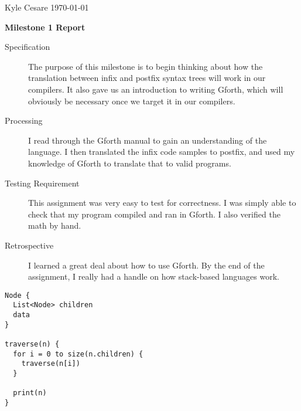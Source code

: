\documentclass[12pt,letterpaper]{article}
\begin{document}
Kyle Cesare \hfill
\today \hfill

{\center\textbf{Milestone 1 Report} \\}

\begin{description}

\item[Specification] The purpose of this milestone is to begin thinking about
how the translation between infix and postfix syntax trees will work in our
compilers. It also gave us an introduction to writing Gforth, which will
obviously be necessary once we target it in our compilers.

\item[Processing] I read through the Gforth manual to gain an understanding of
the language. I then translated the infix code samples to postfix, and used my
knowledge of Gforth to translate that to valid programs.

\item[Testing Requirement] This assignment was very easy to test for
correctness. I was simply able to check that my program compiled and ran in
Gforth. I also verified the math by hand.

\item[Retrospective] I learned a great deal about how to use Gforth. By the end
of the assignment, I really had a handle on how stack-based languages work.

\end{description}

\begin{verbatim}
Node {
  List<Node> children
  data
}

traverse(n) {
  for i = 0 to size(n.children) {
    traverse(n[i])
  }

  print(n)
}
\end{verbatim}
\end{document}
